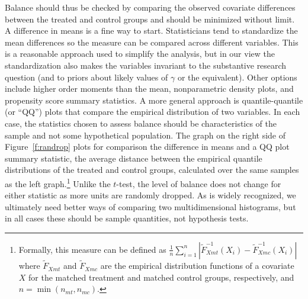 \documentclass[11pt,titlepage]{article}
\begin{document}
Balance should thus be checked by comparing the observed covariate
differences between the treated and control groups and should be
minimized without limit.  A difference in means is a fine way to
start.  Statisticians tend to standardize the mean differences so the
measure can be compared across different variables.  This is a
reasonable approach used to simplify the analysis, but in our view the
standardization also makes the variables invariant to the substantive
research question (and to priors about likely values of $\gamma$ or
the equivalent).  Other options include higher order moments than the
mean, nonparametric density plots, and propensity score summary
statistics. A more general approach is quantile-quantile (or ``QQ'')
plots that compare the empirical distribution of two variables.  In
each case, the statistics chosen to assess balance should be
characteristics of the sample and not some hypothetical population.
The graph on the right side of Figure~\ref{f:randrop} plots for
comparison the difference in means and a QQ plot summary statistic,
the average distance between the empirical quantile distributions of
the treated and control groups, calculated over the same samples as
the left graph.\footnote{Formally, this measure can be defined as
  $\frac{1}{n}\sum_{i=1}^n|\widetilde{F}_{Xmt}^{-1}(X_i)-\widetilde{F}^{-1}_{Xmc}(X_i)|$
  where $\widetilde{F}_{Xmt}$ and $\widetilde{F}_{Xmc}$ are the
  empirical distribution functions of a covariate $X$ for the matched
  treatment and matched control groups, respectively, and
  $n=\min(n_{mt},n_{mc})$.}  Unlike the $t$-test, the level of balance
does not change for either statistic as more units are randomly
dropped.  As is widely recognized, we ultimately need better ways of
comparing two multidimensional histograms, but in all cases these
should be sample quantities, not hypothesis tests.




\end{document}
